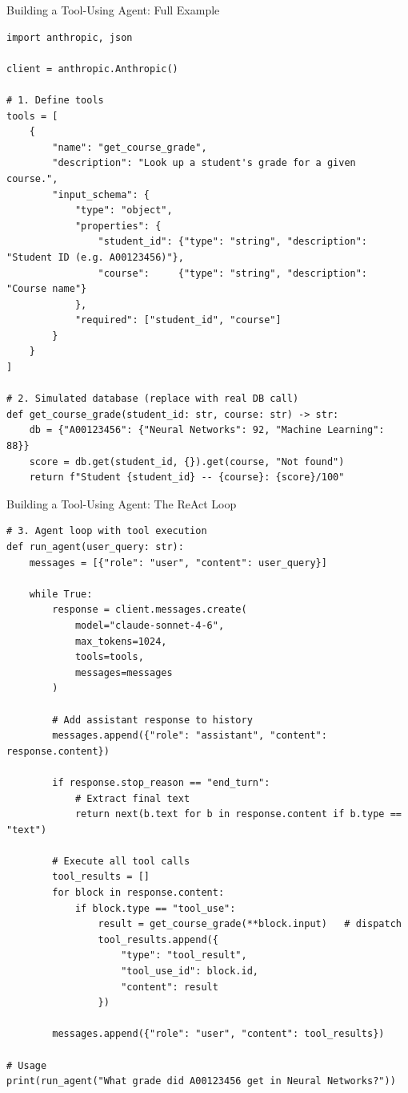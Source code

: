 \documentclass[aspectratio=169,xcolor=dvipsnames]{beamer}
\begin{document}
\begin{frame}[fragile]{Building a Tool-Using Agent: Full Example}
        \begin{lstlisting}[style=PythonStyle]
import anthropic, json

client = anthropic.Anthropic()

# 1. Define tools
tools = [
    {
        "name": "get_course_grade",
        "description": "Look up a student's grade for a given course.",
        "input_schema": {
            "type": "object",
            "properties": {
                "student_id": {"type": "string", "description": "Student ID (e.g. A00123456)"},
                "course":     {"type": "string", "description": "Course name"}
            },
            "required": ["student_id", "course"]
        }
    }
]

# 2. Simulated database (replace with real DB call)
def get_course_grade(student_id: str, course: str) -> str:
    db = {"A00123456": {"Neural Networks": 92, "Machine Learning": 88}}
    score = db.get(student_id, {}).get(course, "Not found")
    return f"Student {student_id} -- {course}: {score}/100"
    \end{lstlisting}
\end{frame}

\begin{frame}[fragile]{Building a Tool-Using Agent: The ReAct Loop}
        \begin{lstlisting}[style=PythonStyle]
# 3. Agent loop with tool execution
def run_agent(user_query: str):
    messages = [{"role": "user", "content": user_query}]

    while True:
        response = client.messages.create(
            model="claude-sonnet-4-6",
            max_tokens=1024,
            tools=tools,
            messages=messages
        )

        # Add assistant response to history
        messages.append({"role": "assistant", "content": response.content})

        if response.stop_reason == "end_turn":
            # Extract final text
            return next(b.text for b in response.content if b.type == "text")

        # Execute all tool calls
        tool_results = []
        for block in response.content:
            if block.type == "tool_use":
                result = get_course_grade(**block.input)   # dispatch
                tool_results.append({
                    "type": "tool_result",
                    "tool_use_id": block.id,
                    "content": result
                })

        messages.append({"role": "user", "content": tool_results})

# Usage
print(run_agent("What grade did A00123456 get in Neural Networks?"))
    \end{lstlisting}
\end{frame}
\end{document}
